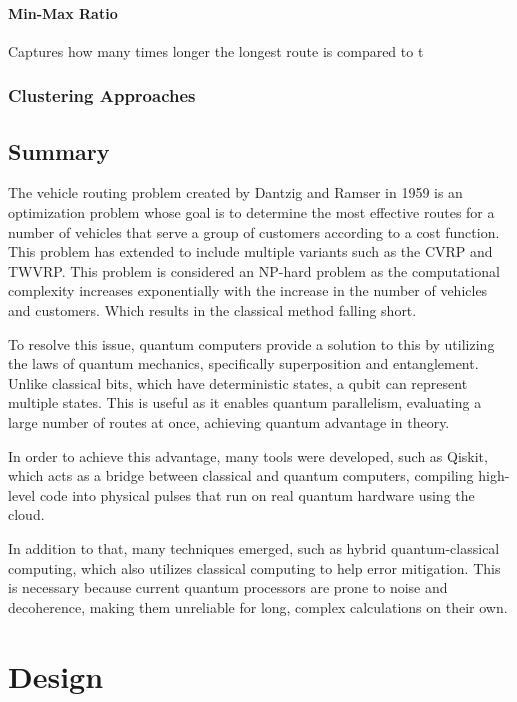 \documentclass[a4paper]{report}
\begin{document}
{\begin{itemize}
\subsubsection{Min-Max Ratio}
Captures how many times longer the longest route is compared to t






\subsection{Clustering Approaches}



\section{Summary}
The vehicle routing problem created by Dantzig and Ramser in 1959 is an optimization problem whose goal is to determine the most effective routes for a number of vehicles that serve a group of customers according to a cost function. This problem has extended to include multiple variants such as the CVRP and TWVRP. This problem is considered an NP-hard problem as the computational complexity increases exponentially with the increase in the number of vehicles and customers. Which results in the classical method falling short. 

To resolve this issue, quantum computers provide a solution to this by utilizing the laws of quantum mechanics, specifically superposition and entanglement. Unlike classical bits, which have deterministic states, a qubit can represent multiple states. This is useful as it enables quantum parallelism, evaluating a large number of routes at once, achieving quantum advantage in theory.

In order to achieve this advantage, many tools were developed, such as Qiskit, which acts as a bridge between classical and quantum computers, compiling high-level code into physical pulses that run on real quantum hardware using the cloud.

In addition to that, many techniques emerged, such as hybrid quantum-classical computing, which also utilizes classical computing to help error mitigation. This is necessary because current quantum processors are prone to noise and decoherence, making them unreliable for long, complex calculations on their own.
\chapter{Design}


\end{itemize}}
\end{document}
